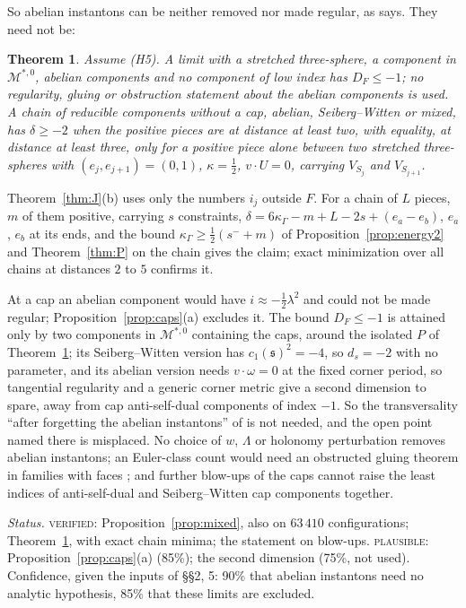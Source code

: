 \documentclass[10pt]{amsart}
\makeatletter
\numberwithin{equation}{section}
\theoremstyle{compact}
\newtheorem{theorem}{Theorem}[section]
\renewenvironment{proof}[1][\proofname]{\par\pushQED{\qed}\normalfont
  \topsep4\p@\relax\trivlist\item[\hskip\labelsep\itshape#1\@addpunct{.}]%
  \ignorespaces}{\popQED\endtrivlist\@endpefalse}
\newcommand{\fs}{\mathfrak s}
\newcommand{\cM}{\mathcal M}
\newcommand{\Ms}{\cM^{*,0}}
\newcommand{\step}[1]{\par\noindent\textit{#1}\enspace}
\newcommand{\ver}{\textsc{verified}}
\newcommand{\pla}{\textsc{plausible}}
\makeatother
\begin{document}
So abelian instantons can be neither removed nor made regular, as \cite{FS}
says. They need not be:

\begin{theorem}\label{thm:mixed}
Assume \textup{(H5)}. A limit with a stretched three-sphere, a component in
$\Ms$, abelian components and no component of low index has $D_F\le-1$; no
regularity, gluing or obstruction statement about the abelian components is
used. A chain of reducible components without a cap, abelian, Seiberg--Witten
or mixed, has $\delta\ge-2$ when the positive pieces are at distance at least
two, with equality, at distance at least three, only for a positive piece alone
between two stretched three-spheres with $(e_j,e_{j+1})=(0,1)$,
$\kappa=\frac12$, $v\cdot U=0$, carrying $V_{S_j}$ and $V_{S_{j+1}}$.
\end{theorem}

\begin{proof}[Sketch]
Theorem~\ref{thm:J}(b) uses only the numbers $i_j$ outside $F$. For a chain of
$L$ pieces, $m$ of them positive, carrying $s$ constraints,
$\delta=6\kappa_\Gamma-m+L-2s+(e_a-e_b)$, $e_a$, $e_b$ at its ends, and the
bound $\kappa_\Gamma\ge\frac12(s^-+m)$ of Proposition~\ref{prop:energy2} and
Theorem~\ref{thm:P} on the chain gives the claim; exact minimization over all
chains at distances $2$ to $5$ confirms it.
\end{proof}

At a cap an abelian component would have $i\approx-\frac12\lambda^2$ and could
not be made regular; Proposition~\ref{prop:caps}(a) excludes it. The bound
$D_F\le-1$ is attained only by two components in $\Ms$ containing the caps,
around the isolated $P$ of Theorem~\ref{thm:mixed}; its Seiberg--Witten version
has $c_1(\fs)^2=-4$, so $d_s=-2$ with no parameter, and its abelian version
needs $v\cdot\omega=0$ at the fixed corner period, so tangential regularity and
a generic corner metric give a second dimension to spare, away from cap
anti-self-dual components of index $-1$. So the transversality ``after forgetting the
abelian instantons'' of \cite[\S4]{FS} is not needed, and the open point named
there is misplaced. No choice of $w$, $\Lambda$ or holonomy perturbation removes
abelian instantons; an Euler-class count would need an obstructed gluing
theorem in families with faces \cite[Hyps.~7.8.1, 11.3.5]{FLM}; and further
blow-ups of the caps cannot raise the least indices of anti-self-dual and
Seiberg--Witten cap components together.

\step{Status.} \ver: Proposition~\ref{prop:mixed}, also on $63\,410$
configurations; Theorem~\ref{thm:mixed}, with exact chain minima; the statement
on blow-ups. \pla: Proposition~\ref{prop:caps}(a) (85\%); the second dimension
(75\%, not used). Confidence, given the inputs of \S\S2, 5: 90\% that abelian
instantons need no analytic hypothesis, 85\% that these limits are excluded.
\end{document}
